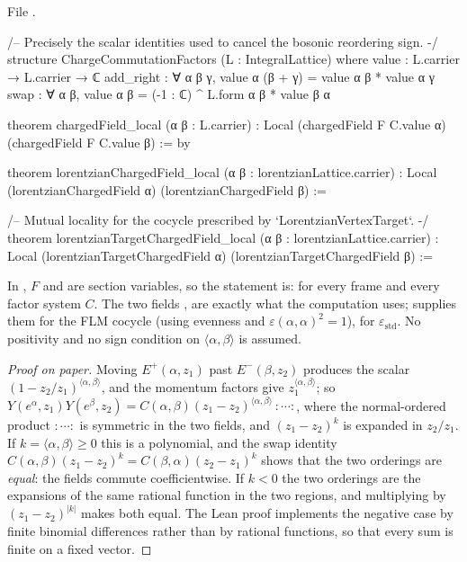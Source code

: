 \noindent File .
\begin{leancode}
/-- Precisely the scalar identities used to cancel the bosonic reordering sign. -/
structure ChargeCommutationFactors (L : IntegralLattice) where
  value : L.carrier → L.carrier → ℂ
  add_right : ∀ α β γ, value α (β + γ) = value α β * value α γ
  swap : ∀ α β, value α β = (-1 : ℂ) ^ L.form α β * value β α

theorem chargedField_local  (α β : L.carrier) :
    Local (chargedField F C.value α) (chargedField F C.value β) := by

theorem lorentzianChargedField_local (α β : lorentzianLattice.carrier) :
    Local (lorentzianChargedField α) (lorentzianChargedField β) :=

/-- Mutual locality for the cocycle prescribed by `LorentzianVertexTarget`. -/
theorem lorentzianTargetChargedField_local (α β : lorentzianLattice.carrier) :
    Local (lorentzianTargetChargedField α) (lorentzianTargetChargedField β) :=
\end{leancode}

\begin{dictionary}
In , $F$ and  are section variables, so the
statement is: for every frame and every factor system $C$.  The two fields ,  are
exactly what the computation uses;  supplies them for the FLM
cocycle (using evenness and $\varepsilon(\alpha,\alpha)^2=1$),  for
$\varepsilon_{\mathrm{std}}$.  No positivity and no sign condition on $\langle\alpha,\beta\rangle$ is assumed.
\end{dictionary}

\begin{proof}[Proof on paper]
Moving $E^+(\alpha,z_1)$ past $E^-(\beta,z_2)$ produces the scalar $(1-z_2/z_1)^{\langle\alpha,\beta\rangle}$, and the
momentum factors give $z_1^{\langle\alpha,\beta\rangle}$; so
$Y(e^\alpha,z_1)Y(e^\beta,z_2)=C(\alpha,\beta)(z_1-z_2)^{\langle\alpha,\beta\rangle}\,{:}\cdots{:}$, where the normal-ordered
product ${:}\cdots{:}$ is symmetric in the two fields, and $(z_1-z_2)^k$ is expanded in $z_2/z_1$.  If
$k=\langle\alpha,\beta\rangle\ge0$ this is a polynomial, and the swap identity $C(\alpha,\beta)(z_1-z_2)^k=C(\beta,\alpha)(z_2-z_1)^k$
shows that the two orderings are \emph{equal}: the fields commute coefficientwise.  If $k<0$ the two
orderings are the expansions of the same rational function in the two regions, and multiplying by
$(z_1-z_2)^{|k|}$ makes both equal.  The Lean proof implements the negative case by finite binomial
differences rather than by rational functions, so that every sum is finite on a fixed vector.
\end{proof}

